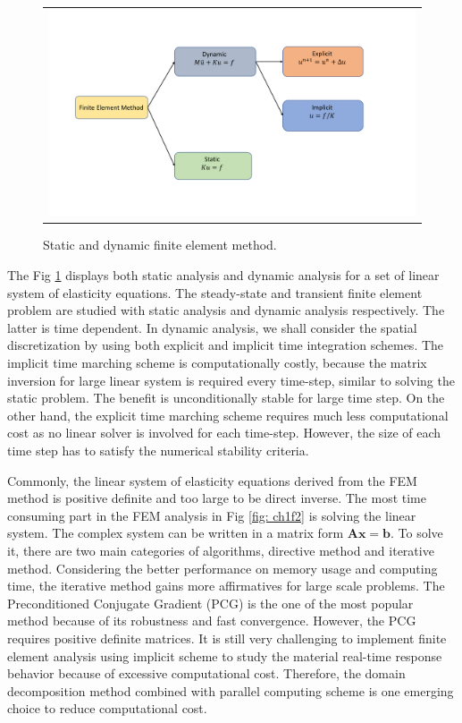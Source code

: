 \begin{figure}[H]
	\centering
	\begin{tabular}{c}
		\includegraphics[width=1.1\textwidth]{./pics/fem}
	\end{tabular}
	\caption{\footnotesize Static and dynamic finite element method.} \label{fig: ch1f3}
\end{figure}

The Fig \ref{fig: ch1f3} displays both static analysis and dynamic analysis for a set of linear system of elasticity equations. The steady-state and transient finite element problem are studied with static analysis and dynamic analysis respectively. The latter is time dependent. In dynamic analysis, we shall consider the spatial discretization by using both explicit and implicit time integration schemes\cite{bathe2008finite}. The implicit time marching scheme is computationally costly, because the matrix inversion for large linear system is required every time-step, similar to solving the static problem. The benefit is unconditionally stable for large time step. On the other hand, the explicit time marching scheme requires much less computational cost as no linear solver is involved for each time-step. However, the size of each time step has to satisfy the numerical stability criteria. 


Commonly, the linear system of elasticity equations derived from the FEM method is positive definite and too large to be direct inverse. The most time consuming part in the FEM analysis in Fig \ref{fig: ch1f2} is solving the linear system. The complex system can be written in a matrix form $ \mathbf{A} \mathbf{x} = \mathbf{b} $. To solve it, there are two main categories of algorithms, directive method and iterative method. Considering the better performance on memory usage and computing time, the iterative method gains more affirmatives\cite{brussino1989comparison} for large scale problems. The Preconditioned Conjugate Gradient (PCG) is the one of the most popular method because of its robustness and fast convergence. However, the PCG requires positive definite matrices. It is still very challenging to implement finite element analysis using implicit scheme to study the material real-time response behavior because of excessive computational cost. Therefore, the domain decomposition method combined with parallel computing scheme is one emerging choice to reduce computational cost.


